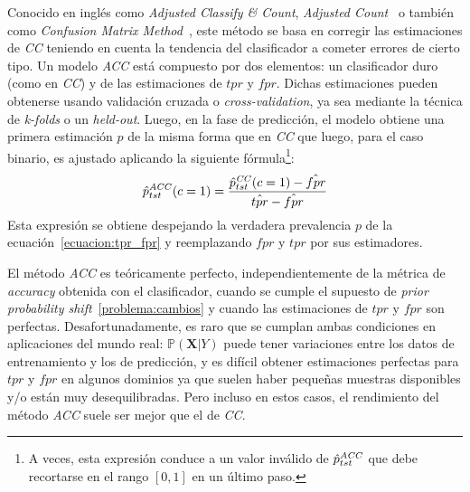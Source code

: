 Conocido en inglés como {\it Adjusted Classify \& Count}, {\it Adjusted
Count\/}~\cite{forman2008quantifying} o también como {\it Confusion Matrix
Method\/}~\cite{saerens2002adjusting}, este método se basa en corregir las
estimaciones de {\it CC\/} teniendo en cuenta la tendencia del clasificador a
cometer errores de cierto tipo. Un modelo {\it ACC\/} está compuesto por dos
elementos: un clasificador duro (como en {\it CC\/}) y de las estimaciones de
\(tpr\) y \(fpr\). Dichas estimaciones pueden obtenerse usando validación
cruzada o {\it cross-validation}, ya sea mediante la técnica de {\it k-folds\/}
o un {\it held-out}. Luego, en la fase de predicción, el modelo obtiene una
primera estimación \(\hat p\) de la misma forma que en {\it CC\/} que luego,
para el caso binario, es ajustado aplicando la siguiente fórmula\footnote{A
veces, esta expresión conduce a un valor inválido de \(\hat p^{\it
ACC\/}_{tst}\) que debe recortarse en el rango \([0, 1]\) en un último paso.}:
\begin{equation}
    \hat p^{\it ACC\/}_{tst}(c=1) = \frac{\hat p^{\it CC\/}_{tst}(c=1)-\hat{fpr}}{\hat{tpr} - \hat{fpr}}\label{ecuacion:acc_binaria}
\end{equation}
Esta expresión se obtiene despejando la verdadera prevalencia \(p\) de la
ecuación~\ref{ecuacion:tpr_fpr} y reemplazando \(fpr\) y \(tpr\) por sus
estimadores.

El método {\it ACC\/} es teóricamente perfecto, independientemente de la métrica
de {\it accuracy\/} obtenida con el clasificador, cuando se cumple el supuesto
de {\it prior probability shift\/}~\ref{problema:cambios} y cuando las
estimaciones de \(tpr\) y \(fpr\) son perfectas. Desafortunadamente, es raro que
se cumplan ambas condiciones en aplicaciones del mundo real:
\(\mathbb{P}(\boldsymbol{X}|Y)\) puede tener variaciones entre los datos de
entrenamiento y los de predicción, y es difícil obtener estimaciones perfectas
para \(tpr\) y \(fpr\) en algunos dominios ya que suelen haber pequeñas muestras
disponibles y/o están muy desequilibradas. Pero incluso en estos casos, el
rendimiento del método {\it ACC\/} suele ser mejor que el de {\it CC}.

